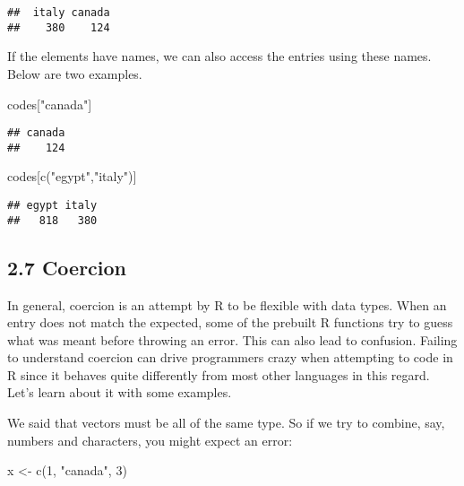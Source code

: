 \documentclass[
]{article}
\newenvironment{Shaded}{\begin{snugshade}}{\end{snugshade}}
\newcommand{\DecValTok}[1]{\textcolor[rgb]{0.00,0.00,0.81}{#1}}
\newcommand{\FunctionTok}[1]{\textcolor[rgb]{0.00,0.00,0.00}{#1}}
\newcommand{\NormalTok}[1]{#1}
\newcommand{\OtherTok}[1]{\textcolor[rgb]{0.56,0.35,0.01}{#1}}
\newcommand{\StringTok}[1]{\textcolor[rgb]{0.31,0.60,0.02}{#1}}
\begin{document}
\begin{verbatim}
##  italy canada 
##    380    124
\end{verbatim}

If the elements have names, we can also access the entries using these
names. Below are two examples.

\begin{Shaded}
\begin{Highlighting}[]
\NormalTok{codes[}\StringTok{"canada"}\NormalTok{]}
\end{Highlighting}
\end{Shaded}

\begin{verbatim}
## canada 
##    124
\end{verbatim}

\begin{Shaded}
\begin{Highlighting}[]
\NormalTok{codes[}\FunctionTok{c}\NormalTok{(}\StringTok{"egypt"}\NormalTok{,}\StringTok{"italy"}\NormalTok{)]}
\end{Highlighting}
\end{Shaded}

\begin{verbatim}
## egypt italy 
##   818   380
\end{verbatim}

\hypertarget{coercion}{%
\subsection{2.7 Coercion}\label{coercion}}

In general, coercion is an attempt by R to be flexible with data types.
When an entry does not match the expected, some of the prebuilt R
functions try to guess what was meant before throwing an error. This can
also lead to confusion. Failing to understand coercion can drive
programmers crazy when attempting to code in R since it behaves quite
differently from most other languages in this regard. Let's learn about
it with some examples.

We said that vectors must be all of the same type. So if we try to
combine, say, numbers and characters, you might expect an error:

\begin{Shaded}
\begin{Highlighting}[]
\NormalTok{x }\OtherTok{\textless{}{-}} \FunctionTok{c}\NormalTok{(}\DecValTok{1}\NormalTok{, }\StringTok{"canada"}\NormalTok{, }\DecValTok{3}\NormalTok{)}
\end{Highlighting}
\end{Shaded}
\end{document}

